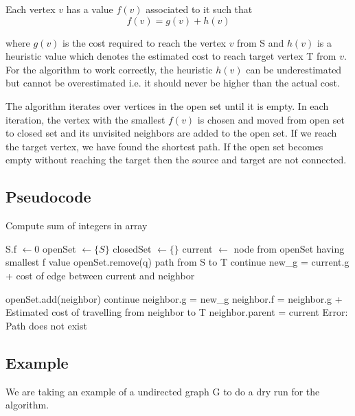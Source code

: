 \documentclass{article}
\theoremstyle{definition}
\begin{document}
Each vertex $v$ has a value $f(v)$ associated to it such that
\[ f(v) = g(v) + h(v) \]

where $g(v)$ is the cost required to reach the vertex $v$ from S and $h(v)$ is a heuristic value which denotes the estimated cost to reach target vertex T from $v$. For the algorithm to work correctly, the heuristic $h(v)$ can be underestimated but cannot be overestimated i.e. it should never be higher than the actual cost.

The algorithm iterates over vertices in the open set until it is empty. In each iteration, the vertex with the smallest $f(v)$ is chosen and moved from open set to closed set and its unvisited neighbors are added to the open set. If we reach the target vertex, we have found the shortest path. If the open set becomes empty without reaching the target then the source and target are not connected.

\subsection{Pseudocode}

\begin{algorithm}[H]
	\caption{Compute sum of integers in array}
	\label{array-sum}
	\begin{algorithmic}[1]
		\State S.f $\leftarrow 0$
		\State openSet $\leftarrow \{S\}$
		\State closedSet $\leftarrow \{\}$
		\State current $\leftarrow$ node from openSet having smallest f value
		\State openSet.remove(q)
		\State \Return path from S to T
		\EndIf
		\State continue
		\EndIf
		\State new\_g = current.g + cost of edge between current and neighbor
		
		    \State openSet.add(neighbor)
	    \Else {}
	        \State continue
	        \EndIf
	    \EndIf
		\State neighbor.g = new\_g
		\State neighbor.f = neighbor.g + Estimated cost of travelling from neighbor to T
		\State neighbor.parent = current
		\EndFor
		\EndWhile
		\State \Return Error: Path does not exist
		\EndProcedure
	\end{algorithmic}
\end{algorithm}
\newpage
\subsection{Example}
We are taking an example of a undirected graph G to do a dry run for the algorithm.
\end{document}
